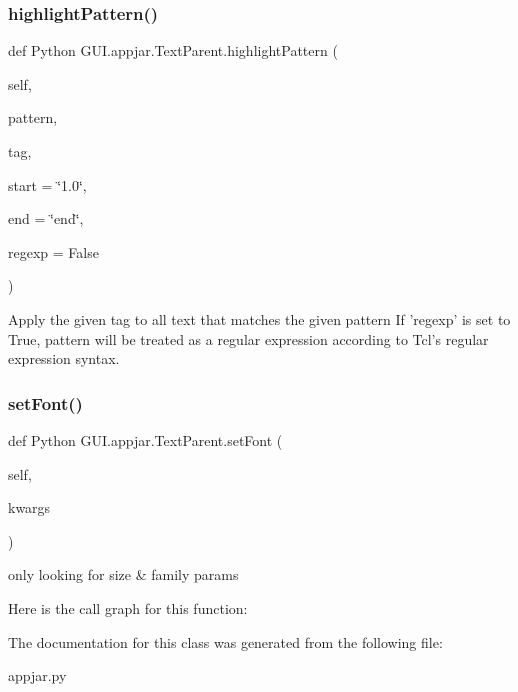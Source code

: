 \subsubsection{\texorpdfstring{highlight\+Pattern()}{highlightPattern()}}
{\footnotesize\ttfamily def Python G\+U\+I.\+appjar.\+Text\+Parent.\+highlight\+Pattern (\begin{DoxyParamCaption}\item[{}]{self,  }\item[{}]{pattern,  }\item[{}]{tag,  }\item[{}]{start = {\ttfamily \char`\"{}1.0\char`\"{}},  }\item[{}]{end = {\ttfamily \char`\"{}end\char`\"{}},  }\item[{}]{regexp = {\ttfamily False} }\end{DoxyParamCaption})}

\begin{DoxyVerb}Apply the given tag to all text that matches the given pattern
If 'regexp' is set to True, pattern will be treated as a regular
expression according to Tcl's regular expression syntax.
\end{DoxyVerb}
 \mbox{\label{class_python_01_g_u_i_1_1appjar_1_1_text_parent_afc89ac1ab138115c2ca21d8149b5164d}} 
\subsubsection{\texorpdfstring{set\+Font()}{setFont()}}
{\footnotesize\ttfamily def Python G\+U\+I.\+appjar.\+Text\+Parent.\+set\+Font (\begin{DoxyParamCaption}\item[{}]{self,  }\item[{}]{kwargs }\end{DoxyParamCaption})}

\begin{DoxyVerb}only looking for size & family params \end{DoxyVerb}
 Here is the call graph for this function\+:


The documentation for this class was generated from the following file\+:\begin{DoxyCompactItemize}
\item 
appjar.\+py\end{DoxyCompactItemize}
